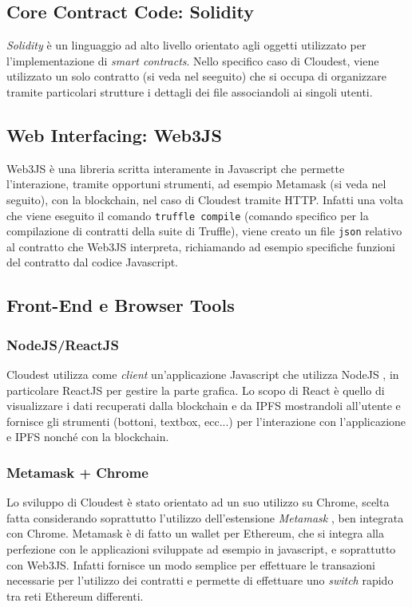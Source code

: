 \documentclass{article}
\begin{document}
\subsection{Core Contract Code: Solidity}
\textit{Solidity} \cite{solidity} è un linguaggio ad alto livello orientato agli oggetti utilizzato per l'implementazione di \textit{smart contracts}. Nello specifico caso di Cloudest, viene utilizzato un solo contratto (si veda nel seeguito) che si occupa di organizzare tramite particolari strutture i dettagli dei file associandoli ai singoli utenti.

\subsection{Web Interfacing: Web3JS}
Web3JS \cite{web3js} è una libreria scritta interamente in Javascript che permette l'interazione, tramite opportuni strumenti, ad esempio Metamask (si veda nel seguito), con la blockchain, nel caso di Cloudest tramite HTTP.
Infatti una volta che viene eseguito il comando \texttt{truffle compile} (comando specifico per la compilazione di contratti della suite di Truffle), viene creato un file \texttt{json} relativo al contratto che Web3JS interpreta, richiamando ad esempio specifiche funzioni del contratto dal codice Javascript.

\subsection{Front-End e Browser Tools}
\subsubsection{NodeJS/ReactJS}
Cloudest utilizza come \textit{client} un'applicazione Javascript che utilizza NodeJS \cite{nodejs}, in particolare ReactJS \cite{reactjs} per gestire la parte grafica. Lo scopo di React è quello di visualizzare i dati recuperati dalla blockchain e da IPFS mostrandoli all'utente e fornisce gli strumenti (bottoni, textbox, ecc...) per l'interazione con l'applicazione e IPFS nonché con la blockchain.

\subsubsection{Metamask + Chrome}
Lo sviluppo di Cloudest è stato orientato ad un suo utilizzo su Chrome, scelta fatta considerando soprattutto l'utilizzo dell'estensione \textit{Metamask} \cite{metamask}, ben integrata con Chrome. Metamask è di fatto un wallet per Ethereum, che si integra alla perfezione con le applicazioni sviluppate ad esempio in javascript, e soprattutto con Web3JS. Infatti fornisce un modo semplice per effettuare le transazioni necessarie per l'utilizzo dei contratti e permette di effettuare uno \textit{switch} rapido tra reti Ethereum differenti.
\end{document}

